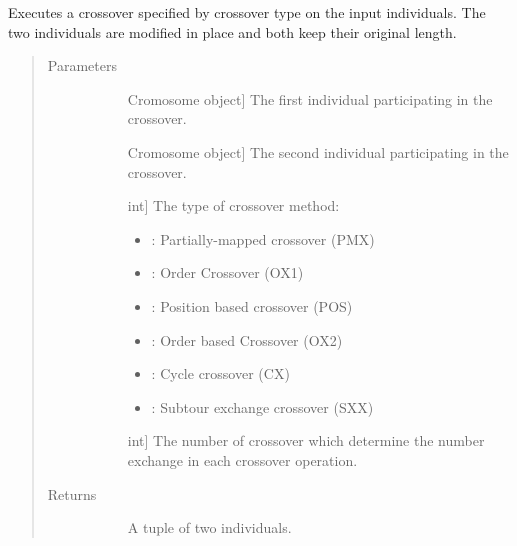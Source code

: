 \documentclass[letterpaper,10pt,english]{sphinxmanual}
\begin{document}
\begin{fulllineitems}
\label{\detokenize{pygace:pygace.ga.gaceCrossover}}
Executes a crossover specified by crossover type  on the input  individuals.
The two individuals are modified in place and both keep their original
length.
\begin{quote}\begin{description}
\item[{Parameters}] \leavevmode\begin{description}
\item[{}] \leavevmode{[}Cromosome object{]}
The first individual participating in the crossover.

\item[{}] \leavevmode{[}Cromosome object{]}
The second individual participating in the crossover.

\item[{}] \leavevmode{[}int{]}
The type of crossover method:
\begin{itemize}
\item {} 
: Partially-mapped crossover (PMX)

\item {} 
: Order Crossover (OX1)

\item {} 
: Position based crossover (POS)

\item {} 
: Order based Crossover (OX2)

\item {} 
: Cycle crossover (CX)

\item {} 
: Subtour exchange crossover (SXX)

\end{itemize}

\item[{}] \leavevmode{[}int{]}
The number of crossover which determine the number exchange in each
crossover operation.

\end{description}

\item[{Returns}] \leavevmode\begin{description}
\item[{}] \leavevmode
A tuple of two individuals.

\end{description}

\end{description}\end{quote}

\end{fulllineitems}
\end{document}
